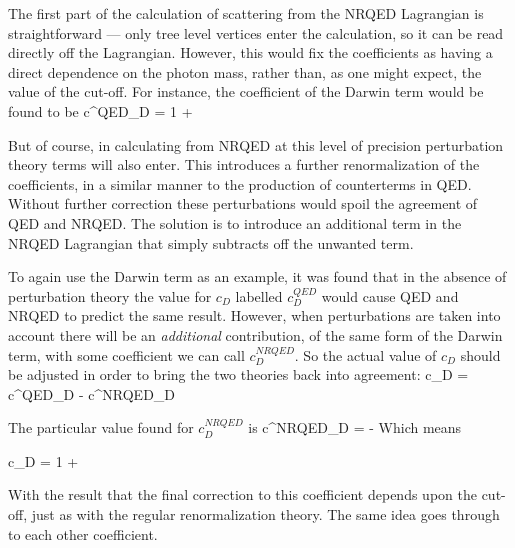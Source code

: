 The first part of the calculation of scattering from the NRQED Lagrangian is straightforward --- only tree level vertices enter the calculation, so it can be read directly off the Lagrangian.  However, this would fix the coefficients as having a direct dependence on the photon mass, rather than, as one might expect, the value of the cut-off.  For instance, the coefficient of the Darwin term would be found to be
\beq
	c^{QED}_D = 1 + \frac{\alpha}{\pi} 
\eeq

But of course, in calculating from NRQED at this level of precision perturbation theory terms will also enter. This introduces a further renormalization of the coefficients, in a similar manner to the production of counterterms in QED.  Without further correction these perturbations would spoil the agreement of QED and NRQED.  The solution is to introduce an additional term in the NRQED Lagrangian that simply subtracts off the unwanted term.

To again use the Darwin term as an example, it was found that in the absence of perturbation theory the value for $c_D$ labelled $c^{QED}_D$ would cause QED and NRQED to predict the same result.  However, when perturbations are taken into account there will be an \emph{additional} contribution, of the same form of the Darwin term, with some coefficient we can call $c^{NRQED}_D$.  So the actual value of $c_D$ should be adjusted in order to bring the two theories back into agreement:
\beq
	c_D = c^{QED}_D - c^{NRQED}_D
\eeq

The particular value found for $c^{NRQED}_D$ is 
\beq
	c^{NRQED}_D = -\frac{\alpha}{\pi} 
\eeq
Which means

\beq
	c_D = 1 + \frac{\alpha}{\pi} 
\eeq

With the result that the final correction to this coefficient depends upon the cut-off, just as with the regular renormalization theory.  The same idea goes through to each other coefficient.

	